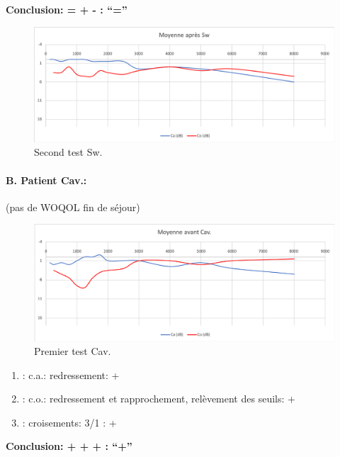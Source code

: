                 \textbf{  Conclusion:  = +  -        : ``=''}

                \begin{figure}
\centering
\includegraphics[width=0.7\linewidth]{images/graphiques/sw_post.png}
\caption[Moyenne OG+OD]{Second test Sw.}
       
\end{figure}




\paragraph{B. Patient Cav.: }

(pas de WOQOL fin de séjour)


\begin{figure}[th]
\centering
\includegraphics[width=0.7\linewidth]{images/graphiques/cav_pre.png}
\caption[Moyenne OG+OD]{Premier test Cav.}
       
\end{figure}

	\begin{enumerate}
 		
 		\item : c.a.: redressement: +
                
 		\item : c.o.: redressement et rapprochement, relèvement des seuils: +
 		\item : croisements: 3/1 :  +
                  
                \end{enumerate}

                \textbf{  Conclusion:  + + +       : ``+''}

